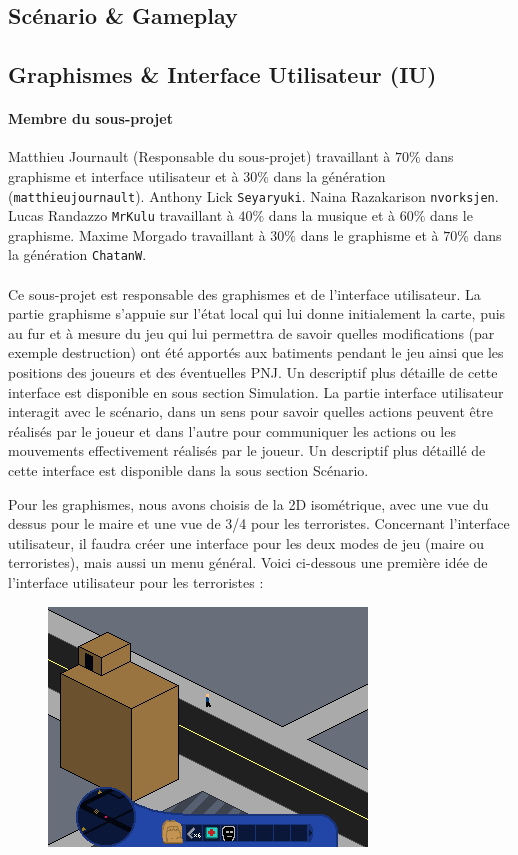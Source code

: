 \documentclass[a4paper,10pt]{article}
\begin{document}
\subsection{Scénario \& Gameplay}
\subsection{Graphismes \& Interface Utilisateur (IU)}
\paragraph{Membre du sous-projet} Matthieu Journault (Responsable du sous-projet) travaillant à $70\%$ dans graphisme et interface utilisateur et à $30\%$ dans la génération (\verb!matthieujournault!). Anthony Lick \verb!Seyaryuki!. Naina Razakarison \verb!nvorksjen!. Lucas Randazzo \verb!MrKulu! travaillant à $40\%$ dans la musique et à $60\%$ dans le graphisme. Maxime Morgado travaillant à  $30\%$ dans le graphisme et à  $70\%$ dans la génération \verb!ChatanW!.
\paragraph{} Ce sous-projet est responsable des graphismes et de l'interface utilisateur. 
La partie graphisme s'appuie sur l'état local qui lui donne initialement la carte, puis au fur et à mesure du jeu qui lui permettra de savoir quelles modifications (par exemple destruction) ont été apportés aux batiments pendant le jeu ainsi que les positions des joueurs et des éventuelles PNJ. Un descriptif plus détaille de cette interface est disponible en sous section Simulation.
La partie interface utilisateur interagit avec le scénario, dans un sens pour savoir quelles actions peuvent être réalisés par le joueur et dans l'autre pour communiquer les actions ou les mouvements effectivement réalisés par le joueur. Un descriptif plus détaillé de cette interface est disponible dans la sous section Scénario.

Pour les graphismes, nous avons choisis de la 2D isométrique, avec une vue du dessus pour le maire et une vue de 3/4 pour les terroristes. 
Concernant l'interface utilisateur, il faudra créer une interface pour les deux modes de jeu (maire ou terroristes), mais aussi un menu général. 
Voici ci-dessous une première idée de l'interface utilisateur pour les terroristes :
\begin{figure}[h]
\centering
 \includegraphics[width = 0.5\linewidth]{TS2014.png}
\end{figure}
\end{document}
